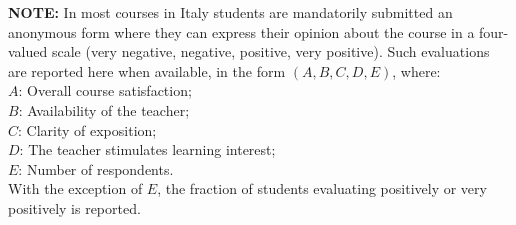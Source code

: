 
{
\scriptsize{
\textbf{NOTE:} In most courses in Italy students are mandatorily submitted an anonymous form
where they can express their opinion about the course in a four-valued scale
(very negative, negative, positive, very positive).
Such evaluations are reported here when available, in the form $(A, B, C, D, E)$, where:
\\$A$: Overall course satisfaction;
\\$B$: Availability of the teacher;
\\$C$: Clarity of exposition;
\\$D$: The teacher stimulates learning interest;
\\$E$: Number of respondents.
\\With the exception of $E$, the fraction of students evaluating positively or very positively is reported.
}
}

\newcommand{\shortcourse}[6]{
    \href{#1}{\textit{\textbf{#2}}},
    \href{#3}{#4},
    \href{#5}{#6}}

\newcommand{\course}[9]{
    \shortcourse{#1}{#2}{#3}{#4}{#5}{#6},
    #7,
    #8.
    \textit{#9}
}

\newcommand{\shortunibocourse}[4]{
    \shortcourse{#1}{#2}
    {http://www.unibo.it}{Alma Mater Studiorum---Università di Bologna}
    {#3}{#4}}

\newcommand{\unibocourse}[7]{
    \course{#1}{#2}
    {http://www.unibo.it}{Alma Mater Studiorum---Università di Bologna}
    {#3}{#4}
    {#5}
    {#6}{#7}
}

